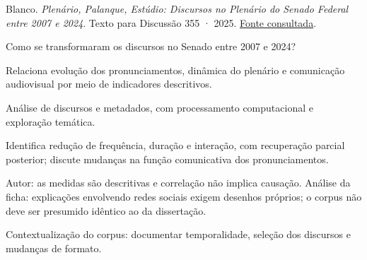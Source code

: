 {\small Blanco. \textit{Plen{\'a}rio, Palanque, Est{\'u}dio: Discursos no Plen{\'a}rio do Senado Federal entre 2007 e 2024}. Texto para Discussão 355 · 2025. \href{https://www12.senado.leg.br/publicacoes/estudos-legislativos/tipos-de-estudos/textos-para-discussao/td355}{Fonte consultada}.\par}

Como se transformaram os discursos no Senado entre 2007 e 2024?

Relaciona evolução dos pronunciamentos, dinâmica do plenário e comunicação audiovisual por meio de indicadores descritivos.

Análise de discursos e metadados, com processamento computacional e exploração temática.

Identifica redução de frequência, duração e interação, com recuperação parcial posterior; discute mudanças na função comunicativa dos pronunciamentos.

\begin{itemize}
\end{itemize}

Autor: as medidas são descritivas e correlação não implica causação. Análise da ficha: explicações envolvendo redes sociais exigem desenhos próprios; o corpus não deve ser presumido idêntico ao da dissertação.

Contextualização do corpus: documentar temporalidade, seleção dos discursos e mudanças de formato.

